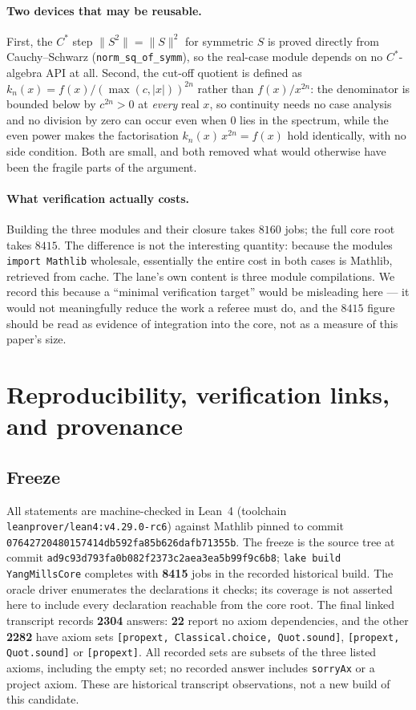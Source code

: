 \documentclass[11pt]{article}
\theoremstyle{definition}
\newcommand{\lean}[1]{\texttt{#1}}
\newcommand{\anchor}{ad9c93d793fa0b082f2373c2aea3ea5b99f9c6b8}
\begin{document}
\paragraph{Two devices that may be reusable.}  First, the $C^*$ step
$\|S^2\| = \|S\|^2$ for symmetric $S$ is proved directly from
Cauchy--Schwarz (\lean{norm\_sq\_of\_symm}), so the real-case module
depends on no $C^*$-algebra API at all.  Second, the cut-off quotient is
defined as
$k_n(x) = f(x)/(\max(c,|x|))^{2n}$ rather than $f(x)/x^{2n}$: the
denominator is bounded below by $c^{2n} > 0$ at \emph{every} real $x$, so
continuity needs no case analysis and no division by zero can occur even
when $0$ lies in the spectrum, while the even power makes the
factorisation $k_n(x)\,x^{2n} = f(x)$ hold identically, with no side
condition.  Both are small, and both removed what would otherwise have
been the fragile parts of the argument.

\paragraph{What verification actually costs.}  Building the three modules
and their closure takes $8160$ jobs; the full core root takes $8415$.  The
difference is not the interesting quantity: because the modules
\lean{import Mathlib} wholesale, essentially the entire cost in both cases
is Mathlib, retrieved from cache.  The lane's own content is three module
compilations.  We record this because a ``minimal verification target''
would be misleading here --- it would not meaningfully reduce the work a
referee must do, and the $8415$ figure should be read as evidence of
integration into the core, not as a measure of this paper's size.

\section{Reproducibility, verification links, and provenance}
\label{sec:prov}

\subsection*{Freeze}

All statements are machine-checked in Lean~4 (toolchain
\lean{leanprover/lean4:v4.29.0-rc6}) against Mathlib pinned to commit
\lean{0764272048\-0157414db592fa85b626dafb71355b}.  The freeze is the
source tree at commit
\lean{\anchor}; \lean{lake build YangMillsCore} completes with
\textbf{8415} jobs in the recorded historical build.  The oracle driver
enumerates the declarations it checks; its coverage is not asserted here
to include every declaration reachable from the core root.  The final
linked transcript records \textbf{2304} answers: \textbf{22} report no
axiom dependencies, and the other \textbf{2282} have axiom sets
\lean{[propext, Classical.choice, Quot.sound]},
\lean{[propext, Quot.sound]} or \lean{[propext]}.
All recorded sets are subsets of the three listed axioms, including the
empty set; no recorded answer includes \lean{sorryAx} or a project axiom.
These are historical transcript observations, not a new build of this candidate.
\end{document}
